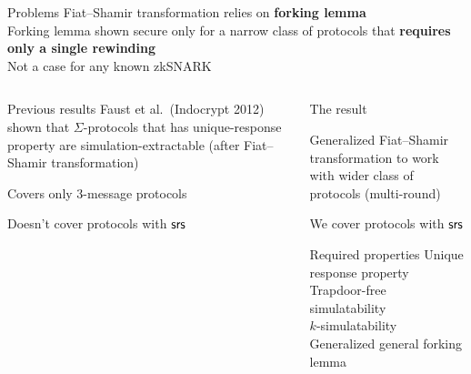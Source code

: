 \documentclass[aspectratio=169,handout]{beamer}
\renewcommand{\emph}[1]{\textbf{#1}}
\begin{document}
\begin{frame}
  \begin{block}{Problems}
    Fiat--Shamir transformation relies on \emph{forking lemma}\\
    Forking lemma shown secure only for a narrow class of protocols that
    \emph{requires only a single rewinding}\\
    Not a case for any known zkSNARK
  \end{block}
  \begin{columns}[t]
    \begin{column}{0.5\linewidth}
      \begin{block}{Previous results}
        Faust et al.~(Indocrypt 2012) shown that $\Sigma$-protocols that has
        unique-response property are simulation-extractable (after Fiat--Shamir
        transformation)
        \begin{compactitem}
        \item Covers only $3$-message protocols
        \item Doesn't cover protocols with $\mathsf{srs}$
        \end{compactitem}
      \end{block}
    \end{column}
    \begin{column}{0.4\linewidth}
      \begin{block}{The result}
        \begin{compactitem}
        \item Generalized Fiat--Shamir transformation to work with wider class
          of protocols (multi-round)
        \item We cover protocols with $\mathsf{srs}$
        \end{compactitem}
      \end{block}
      \begin{block}{Required properties}
        Unique response property\\
        Trapdoor-free simulatability\\
        $k$-simulatability\\
        Generalized general forking lemma
      \end{block}
    \end{column}
  \end{columns}
\end{frame}
\end{document}
